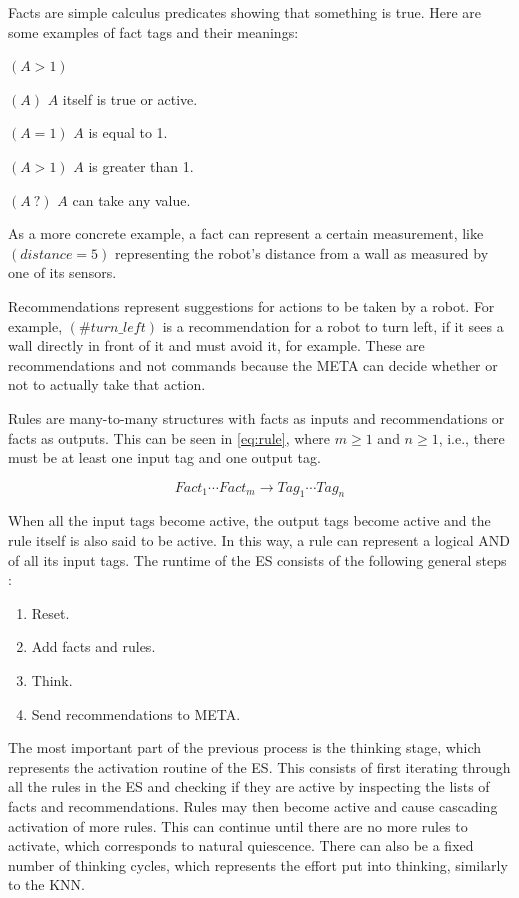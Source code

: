 \documentclass[titlepage,11pt]{article}
\begin{document}
Facts are simple calculus predicates showing that something is true. Here are some examples of fact tags and their meanings:

\begin{labeling}{$(A > 1)$}
	\item[$(A)$] $A$ itself is true or active.
	\item[$(A = 1)$] $A$ is equal to 1.
	\item[$(A > 1)$] $A$ is greater than 1.
	\item[$(A \ ?)$] $A$ can take any value.
\end{labeling}

As a more concrete example, a fact can represent a certain measurement, like $(distance = 5)$ representing the robot's distance from a wall as measured by one of its sensors.

Recommendations represent suggestions for actions to be taken by a robot. For example, $(\#turn\_left)$ is a recommendation for a robot to turn left, if it sees a wall directly in front of it and must avoid it, for example. These are recommendations and not commands because the META can decide whether or not to actually take that action.

Rules are many-to-many structures with facts as inputs and recommendations or facts as outputs. This can be seen in \autoref{eq:rule}, where $m \geq 1$ and $n \geq 1$, i.e., there must be at least one input tag and one output tag. 

\begin{equation} \label{eq:rule}
Fact_1 \cdots Fact_m \rightarrow Tag_1 \cdots Tag_n
\end{equation}

When all the input tags become active, the output tags become active and the rule itself is also said to be active. In this way, a rule can represent a logical AND of all its input tags. The runtime of the ES consists of the following general steps \cite{vybihal-expert}:

\begin{enumerate}
	\item Reset.
	\item Add facts and rules.
	\item Think.
	\item Send recommendations to META.
\end{enumerate}

The most important part of the previous process is the thinking stage, which represents the activation routine of the ES. This consists of first iterating through all the rules in the ES and checking if they are active by inspecting the lists of facts and recommendations. Rules may then become active and cause cascading activation of more rules. This can continue until there are no more rules to activate, which corresponds to natural quiescence. There can also be a fixed number of thinking cycles, which represents the effort put into thinking, similarly to the KNN.
\end{document}
